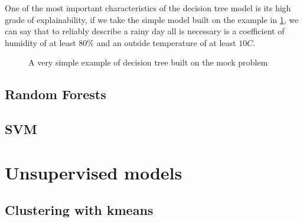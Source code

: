 One of the most important characteristics of the decision tree model is its high grade of
explainability, if we take the simple model built on the example in \cref{fig:simple-dt}, we can say
that to reliably describe a rainy day all is necessary is a coefficient of humidity of at least
$80\%$ and an outside temperature of at least $10C$.
\begin{figure}
	\centering
	\caption{A very simple example of decision tree built on the mock problem}
	\label{fig:simple-dt}
\end{figure}
\subsection{Random Forests}
\subsection{SVM}
\section{Unsupervised models}
\subsection{Clustering with k\-means}
